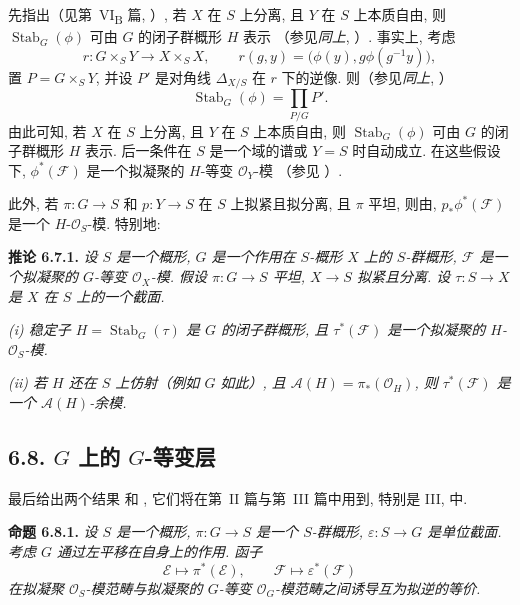 先指出（见第~VI\textsubscript{B} 篇,
）, 若 \(X\) 在 \(S\) 上分离,
且 \(Y\) 在 \(S\) 上本质自由, 则 \(\operatorname{Stab}_G(\phi)\)
可由 \(G\) 的闭子群概形 \(H\) 表示
（参见\emph{同上}, ）.
事实上, 考虑
\[
  r:G\times_SY\longrightarrow X\times_SX,
  \qquad
  r(g,y)=\bigl(\phi(y),g\phi(g^{-1}y)\bigr),
\]
置 \(P=G\times_SY\), 并设 \(P'\) 是对角线 \(\Delta_{X/S}\)
在 \(r\) 下的逆像. 则（参见\emph{同上},
）
\[
  \operatorname{Stab}_G(\phi)=\prod_{P/G}P'.
\]
由此可知, 若 \(X\) 在 \(S\) 上分离, 且 \(Y\) 在 \(S\) 上本质自由,
则 \(\operatorname{Stab}_G(\phi)\) 可由 \(G\) 的闭子群概形 \(H\) 表示.
后一条件在 \(S\) 是一个域的谱或 \(Y=S\) 时自动成立.
在这些假设下, \(\phi^*(\mathcal F)\) 是一个拟凝聚的
\(H\)-等变 \(\mathcal O_Y\)-模
（参见 ）.

此外, 若 \(\pi:G\to S\) 和 \(p:Y\to S\) 在 \(S\) 上拟紧且拟分离,
且 \(\pi\) 平坦, 则由,
\(p_*\phi^*(\mathcal F)\) 是一个 \(H\)-\(\mathcal O_S\)-模.
特别地:

\medskip
\noindent{}\textbf{推论 6.7.1.}
\textit{设 \(S\) 是一个概形, \(G\) 是一个作用在 \(S\)-概形 \(X\)
上的 \(S\)-群概形, \(\mathcal F\) 是一个拟凝聚的 \(G\)-等变
\(\mathcal O_X\)-模. 假设 \(\pi:G\to S\) 平坦,
\(X\to S\) 拟紧且分离. 设 \(\tau:S\to X\) 是 \(X\) 在 \(S\) 上的一个截面.}

\textit{(i) 稳定子 \(H=\operatorname{Stab}_G(\tau)\) 是 \(G\) 的闭子群概形,
且 \(\tau^*(\mathcal F)\) 是一个拟凝聚的
\(H\)-\(\mathcal O_S\)-模.}

\textit{(ii) 若 \(H\) 还在 \(S\) 上仿射（例如 \(G\) 如此）, 且
\(\mathscr A(H)=\pi_*(\mathcal O_H)\), 则
\(\tau^*(\mathcal F)\) 是一个 \(\mathscr A(H)\)-余模.}

\subsection*{6.8. \(G\) 上的 \(G\)-等变层}

最后给出两个结果  和
, 它们将在第~II 篇与第~III 篇中用到,
特别是 III,  中.

\medskip
\noindent{}\textbf{命题 6.8.1.}
\textit{设 \(S\) 是一个概形, \(\pi:G\to S\) 是一个 \(S\)-群概形,
\(\varepsilon:S\to G\) 是单位截面. 考虑 \(G\) 通过左平移在自身上的作用.
函子}
\[
  \mathcal E\longmapsto\pi^*(\mathcal E),
  \qquad
  \mathcal F\longmapsto\varepsilon^*(\mathcal F)
\]
\textit{在拟凝聚 \(\mathcal O_S\)-模范畴与拟凝聚的 \(G\)-等变
\(\mathcal O_G\)-模范畴之间诱导互为拟逆的等价.}

